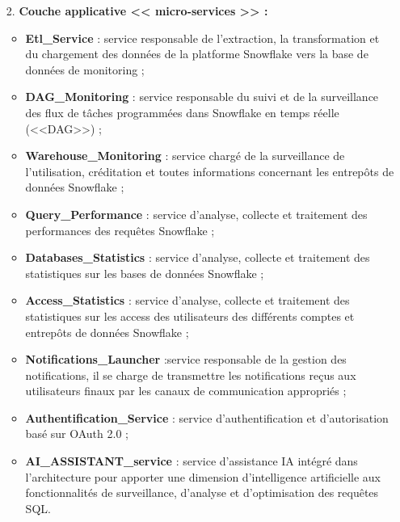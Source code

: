 \begin{enumerate}
         \item[2.] \textbf{Couche applicative << micro-services >> :}
                \begin{itemize}
                \item \textbf{Etl\_Service} : service responsable de l'extraction, la transformation et du chargement des données de la platforme Snowflake vers la base de données de monitoring ;
                \item \textbf{DAG\_Monitoring} : service responsable du suivi et de la surveillance des flux de tâches programmées dans Snowflake en temps réelle (<<DAG>>) ;
                \item \textbf{Warehouse\_Monitoring} : service chargé de la surveillance de l'utilisation, créditation et toutes informations concernant les entrepôts de données Snowflake ;
                \item \textbf{Query\_Performance } : service d'analyse, collecte et traitement des performances des requêtes Snowflake ;
                \item \textbf{ Databases\_Statistics} : service d'analyse, collecte et traitement des statistiques sur les bases de données Snowflake ;
                \item \textbf{Access\_Statistics} : service d'analyse, collecte et traitement des statistiques sur les access des utilisateurs des différents comptes et entrepôts de données Snowflake ;
                \item \textbf{Notifications\_Launcher } :service responsable de la gestion des notifications, il se charge de transmettre les notifications reçus aux utilisateurs finaux par les canaux de communication appropriés ;
                \item \textbf{Authentification\_Service } : service d'authentification et d'autorisation basé sur OAuth 2.0 ;
                \item \textbf{AI\_ASSISTANT\_service } : service d'assistance IA intégré dans l'architecture pour apporter une dimension d'intelligence artificielle aux fonctionnalités de surveillance, d'analyse et d'optimisation des requêtes SQL.


\end{itemize}
\end{enumerate}
